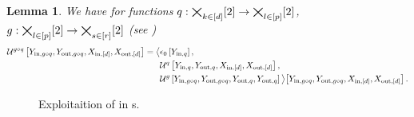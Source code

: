\documentclass[aps,onecolumn,nofootinbib,pra]{article}
\newtheorem{lemma}{Lemma}
\begin{document}
    \begin{lemma}
        We have for functions $q:\bigtimes_{k\in[d]}[2]\rightarrow\bigtimes_{l\in[p]}[2]$, $g:\bigtimes_{l\in[p]}[2]\rightarrow\bigtimes_{s\in[r]}[2]$ (see )
        \begin{align*}
            \mathcal{U}^{g\circ q}\left[Y_{\mathrm{in},g\circ q},Y_{\mathrm{out},g\circ q},X_{\mathrm{in},[d]},X_{\mathrm{out},[d]}\right]
            = \big\langle 
                &\epsilon_{0}\left[Y_{\mathrm{in},q}\right],\\
                &\mathcal{U}^{q}\left[Y_{\mathrm{in},q},Y_{\mathrm{out},q},X_{\mathrm{in},[d]},X_{\mathrm{out},[d]}\right],\\
                &\mathcal{U}^{g}\left[Y_{\mathrm{in},g\circ q},Y_{\mathrm{out},g\circ q},Y_{\mathrm{out},q},Y_{\mathrm{out},q}\right]
             \big\rangle \big[ 
                Y_{\mathrm{in},g\circ q},Y_{\mathrm{out},g\circ q},X_{\mathrm{in},[d]},X_{\mathrm{out},[d]}
             \big] \, .
        \end{align*}
    \end{lemma}


    \begin{figure}
        \begin{center}
            
        \end{center}
        \caption{
           Exploitaition of \DecompositionSparsity{} in \computationCircuit{}s.
        }\label{fig:qcbencodingDecomposition}
    \end{figure}
\end{document}
